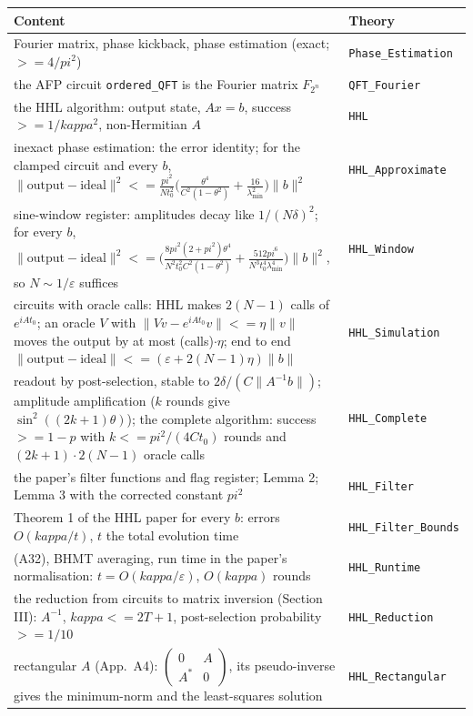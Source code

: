 \documentclass[11pt,a4paper]{article}
\newcommand{\norm}[1]{\|#1\|}
\theoremstyle{definition}
\def\le{<=}\def\ge{>=}\def\to{->}\def\mapsto{|->}\def\oplus{+}\def\kappa{kappa}\def\pi{pi}}
\begin{document}
{\small
\begin{longtable}{p{}l}
\textbf{Content} & \textbf{Theory}\\\hline\endhead
Fourier matrix, phase kickback, phase estimation (exact; $\ge4/\pi^2$) & \texttt{Phase\_Estimation}\\
the AFP circuit \texttt{ordered\_QFT} is the Fourier matrix $F_{2^n}$ & \texttt{QFT\_Fourier}\\
the HHL algorithm: output state, $Ax=b$, success $\ge1/\kappa^2$, non-Hermitian $A$ & \texttt{HHL}\\
inexact phase estimation: the error identity; for the clamped circuit and every $b$, $\norm{\text{output}-\text{ideal}}^2\le\frac{\pi^2}{Nt_0^2}\bigl(\frac{\theta^4}{C^2(1-\theta^2)}+\frac{16}{\lambda_{\min}^2}\bigr)\norm b^2$ & \texttt{HHL\_Approximate}\\
sine-window register: amplitudes decay like $1/(N\delta)^2$; for every $b$, $\norm{\text{output}-\text{ideal}}^2\le\bigl(\frac{8\pi^2(2+\pi^2)\theta^4}{N^2t_0^2C^2(1-\theta^2)}+\frac{512\pi^6}{N^3t_0^4\lambda_{\min}^4}\bigr)\norm b^2$, so $N\sim1/\varepsilon$ suffices & \texttt{HHL\_Window}\\
circuits with oracle calls: HHL makes $2(N-1)$ calls of $e^{iAt_0}$; an oracle $V$ with $\norm{Vv-e^{iAt_0}v}\le\eta\norm v$ moves the output by at most (calls)$\cdot\eta$; end to end $\norm{\text{output}-\text{ideal}}\le(\varepsilon+2(N-1)\eta)\norm b$ & \texttt{HHL\_Simulation}\\
readout by post-selection, stable to $2\delta/(C\norm{A^{-1}b})$; amplitude amplification ($k$ rounds give $\sin^2((2k+1)\theta)$); the complete algorithm: success $\ge1-p$ with $k\le\pi^2/(4Ct_0)$ rounds and $(2k+1)\cdot2(N-1)$ oracle calls & \texttt{HHL\_Complete}\\
the paper's filter functions and flag register; Lemma 2; Lemma 3 with the corrected constant $\pi^2$ & \texttt{HHL\_Filter}\\
Theorem 1 of the HHL paper for every $b$: errors $O(\kappa/t)$, $t$ the total evolution time & \texttt{HHL\_Filter\_Bounds}\\
(A32), BHMT averaging, run time in the paper's normalisation: $t=O(\kappa/\varepsilon)$, $O(\kappa)$ rounds & \texttt{HHL\_Runtime}\\
the reduction from circuits to matrix inversion (Section III): $A^{-1}$, $\kappa\le2T+1$, post-selection probability $\ge1/10$ & \texttt{HHL\_Reduction}\\
rectangular $A$ (App.~A4): $\left(\begin{smallmatrix}0&A\\A^*&0\end{smallmatrix}\right)$, its pseudo-inverse gives the minimum-norm and the least-squares solution & \texttt{HHL\_Rectangular}\\

\end{longtable}}
\end{document}
